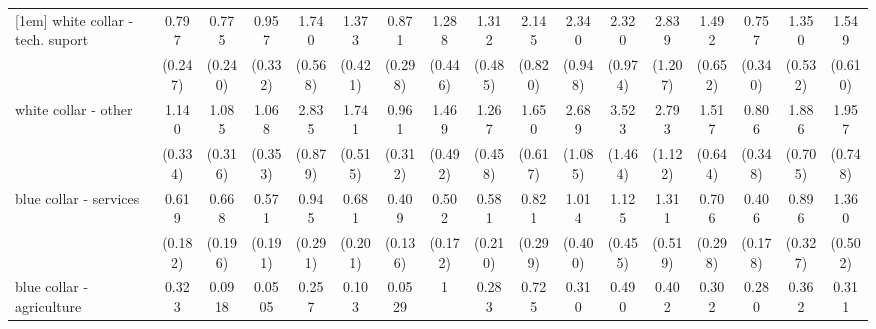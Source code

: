 {\begin{tabular}{l*{16}{c}}
[1em]
white collar - tech. suport&       0.797         &       0.775         &       0.957         &       1.740         &       1.373         &       0.871         &       1.288         &       1.312         &       2.145\sym{*}  &       2.340\sym{*}  &       2.320\sym{*}  &       2.839\sym{*}  &       1.492         &       0.757         &       1.350         &       1.549         \\
                    &     (0.247)         &     (0.240)         &     (0.332)         &     (0.568)         &     (0.421)         &     (0.298)         &     (0.446)         &     (0.485)         &     (0.820)         &     (0.948)         &     (0.974)         &     (1.207)         &     (0.652)         &     (0.340)         &     (0.532)         &     (0.610)         \\
[1em]
white collar - other&       1.140         &       1.085         &       1.068         &       2.835\sym{***}&       1.741         &       0.961         &       1.469         &       1.267         &       1.650         &       2.689\sym{*}  &       3.523\sym{**} &       2.793\sym{*}  &       1.517         &       0.806         &       1.886         &       1.957         \\
                    &     (0.334)         &     (0.316)         &     (0.353)         &     (0.879)         &     (0.515)         &     (0.312)         &     (0.492)         &     (0.458)         &     (0.617)         &     (1.085)         &     (1.464)         &     (1.122)         &     (0.644)         &     (0.348)         &     (0.705)         &     (0.748)         \\
[1em]
blue collar - services&       0.619         &       0.668         &       0.571         &       0.945         &       0.681         &       0.409\sym{**} &       0.502\sym{*}  &       0.581         &       0.821         &       1.014         &       1.125         &       1.311         &       0.706         &       0.406\sym{*}  &       0.896         &       1.360         \\
                    &     (0.182)         &     (0.196)         &     (0.191)         &     (0.291)         &     (0.201)         &     (0.136)         &     (0.172)         &     (0.210)         &     (0.299)         &     (0.400)         &     (0.455)         &     (0.519)         &     (0.298)         &     (0.178)         &     (0.327)         &     (0.502)         \\
[1em]
blue collar - agriculture&       0.323         &      0.0918\sym{**} &      0.0505\sym{**} &       0.257         &       0.103\sym{*}  &      0.0529\sym{**} &           1         &       0.283         &       0.725         &       0.310         &       0.490         &       0.402         &       0.302         &       0.280         &       0.362         &       0.311         \\

\end{tabular}}
